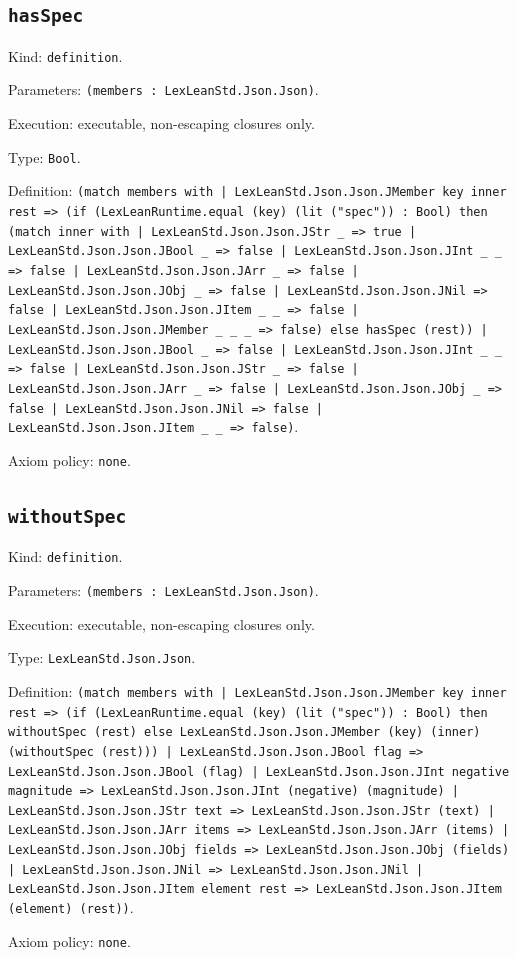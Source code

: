 \documentclass[11pt]{article}
\begin{document}
\subsection*{\texttt{hasSpec}}
\noindent Kind: \texttt{definition}.\par
\noindent Parameters: \texttt{(members : LexLeanStd.Json.Json)}.\par
\noindent Execution: executable, non-escaping closures only.\par
\noindent Type: \texttt{Bool}.\par
\noindent Definition: \texttt{(match members with | LexLeanStd.Json.Json.JMember key inner rest => (if (LexLeanRuntime.equal (key) (lit ("spec")) : Bool) then (match inner with | LexLeanStd.Json.Json.JStr \_ => true | LexLeanStd.Json.Json.JBool \_ => false | LexLeanStd.Json.Json.JInt \_ \_ => false | LexLeanStd.Json.Json.JArr \_ => false | LexLeanStd.Json.Json.JObj \_ => false | LexLeanStd.Json.Json.JNil => false | LexLeanStd.Json.Json.JItem \_ \_ => false | LexLeanStd.Json.Json.JMember \_ \_ \_ => false) else hasSpec (rest)) | LexLeanStd.Json.Json.JBool \_ => false | LexLeanStd.Json.Json.JInt \_ \_ => false | LexLeanStd.Json.Json.JStr \_ => false | LexLeanStd.Json.Json.JArr \_ => false | LexLeanStd.Json.Json.JObj \_ => false | LexLeanStd.Json.Json.JNil => false | LexLeanStd.Json.Json.JItem \_ \_ => false)}.\par
\noindent Axiom policy: \texttt{none}.\par
\subsection*{\texttt{withoutSpec}}
\noindent Kind: \texttt{definition}.\par
\noindent Parameters: \texttt{(members : LexLeanStd.Json.Json)}.\par
\noindent Execution: executable, non-escaping closures only.\par
\noindent Type: \texttt{LexLeanStd.Json.Json}.\par
\noindent Definition: \texttt{(match members with | LexLeanStd.Json.Json.JMember key inner rest => (if (LexLeanRuntime.equal (key) (lit ("spec")) : Bool) then withoutSpec (rest) else LexLeanStd.Json.Json.JMember (key) (inner) (withoutSpec (rest))) | LexLeanStd.Json.Json.JBool flag => LexLeanStd.Json.Json.JBool (flag) | LexLeanStd.Json.Json.JInt negative magnitude => LexLeanStd.Json.Json.JInt (negative) (magnitude) | LexLeanStd.Json.Json.JStr text => LexLeanStd.Json.Json.JStr (text) | LexLeanStd.Json.Json.JArr items => LexLeanStd.Json.Json.JArr (items) | LexLeanStd.Json.Json.JObj fields => LexLeanStd.Json.Json.JObj (fields) | LexLeanStd.Json.Json.JNil => LexLeanStd.Json.Json.JNil | LexLeanStd.Json.Json.JItem element rest => LexLeanStd.Json.Json.JItem (element) (rest))}.\par
\noindent Axiom policy: \texttt{none}.\par
\end{document}
